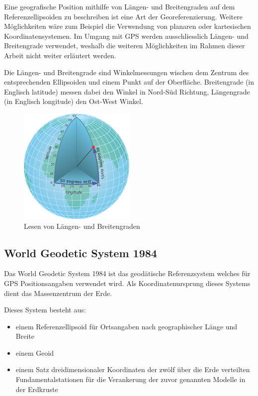 Eine geografische Position mithilfe von Längen- und Breitengraden auf dem Referenzellipsoiden zu beschreiben ist eine Art der Georeferenzierung. Weitere Möglichkeiten wäre zum Beispiel die Verwendung von planaren oder kartesischen Koordinatensystemen. Im Umgang mit GPS werden ausschliesslich Längen- und Breitengrade verwendet, weshalb die weiteren Möglichkeiten im Rahmen dieser Arbeit nicht weiter erläutert werden.

Die Längen- und Breitengrade sind Winkelmessungen wischen dem Zentrum des entsprechenden Ellipsoiden und einem Punkt auf der Oberfläche. Breitengrade (in Englisch latitude) messen dabei den Winkel in Nord-Süd Richtung, Längengrade (in Englisch longitude) den Ost-West Winkel. \cite{georef}

\begin{figure}[h]
  \centering
  \includegraphics[width=0.5\textwidth]{images/longlat.png}
  \caption[Längen- und Breitengrade]{Lesen von Längen- und Breitengraden \cite{georef}}
  \label{fig:longlat}
\end{figure}

\subsection{World Geodetic System 1984}
Das World Geodetic System 1984 ist das geodätische Referenzsystem welches für GPS Positionsangaben verwendet wird. Als Koordinatenursprung dieses Systems dient das Massenzentrum der Erde. 

Dieses System besteht aus:
\begin{itemize}
	\item einem Referenzellipsoid für Ortsangaben nach geographischer Länge und Breite
	\item einem Geoid
	\item einem Satz dreidimensionaler Koordinaten der zwölf über die Erde verteilten Fundamentalstationen für die Verankerung der zuvor genannten Modelle in der Erdkruste \cite{wsg84}
\end{itemize}

